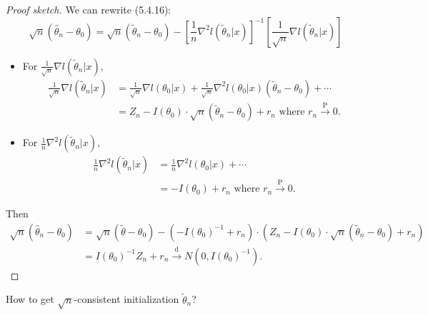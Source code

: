 \documentclass[a4paper]{article}
\begin{document}
\begin{proof}[Proof sketch]
	We can rewrite (5.4.16):
	\begin{equation*}
		\sqrt{n}(\hat{\theta}_n - \theta_0) = \sqrt{n}(\tilde{\theta}_n - \theta_0) - \left[\frac{1}{n}\nabla^2 l(\tilde{\theta}_n | x)\right]^{-1} \left[\frac{1}{\sqrt{n}}\nabla l(\tilde{\theta}_n | x)\right]
	\end{equation*}
	\begin{itemize}
		\item For $\frac{1}{\sqrt{n}} \nabla l(\tilde{\theta}_n | x)$,
		\begin{equation*}
			\begin{aligned}
				\frac{1}{\sqrt{n}} \nabla l(\tilde{\theta}_n | x) &= \frac{1}{\sqrt{n}} \nabla l(\theta_0|x) + \frac{1}{\sqrt{n}} \nabla^2 l(\theta_0|x)(\tilde{\theta}_n - \theta_0) + \cdots \\
				&= Z_n - I(\theta_0) \cdot \sqrt{n}(\tilde{\theta}_n - \theta_0) + r_n \text{ where } r_n \stackrel{\text{P}}{\longrightarrow} 0.
			\end{aligned}
		\end{equation*}
		\item For $\frac{1}{n} \nabla^2 l(\tilde{\theta}_n | x)$,
		\begin{equation*}
			\begin{aligned}
				\frac{1}{n} \nabla^2 l(\tilde{\theta}_n | x) &= \frac{1}{n} \nabla^2 l(\theta_0|x) + \cdots \\
				&= -I(\theta_0) + r_n \text{ where } r_n \stackrel{\text{P}}{\longrightarrow} 0.
			\end{aligned}
		\end{equation*}
	\end{itemize}
	Then
	\begin{equation}
		\begin{aligned}
			\sqrt{n}(\hat{\theta}_n - \theta_0) &= \sqrt{n}(\tilde{\theta}-\theta_0) - (-I(\theta_0)^{-1} + r_n) \cdot (Z_n  - I(\theta_0) \cdot \sqrt{n}(\tilde{\theta}_n - \theta_0) + r_n) \\
			&= I(\theta_0)^{-1} Z_n + r_n \stackrel{\text{d}}{\longrightarrow} N(0,I(\theta_0)^{-1}).
		\end{aligned}
	\end{equation}
\end{proof}

\begin{question}
	How to get $\sqrt{n}$-consistent initialization $\tilde{\theta}_n$?
\end{question}
\end{document}
